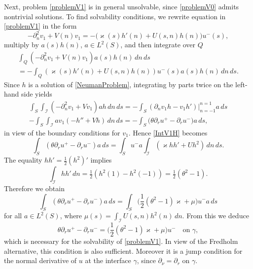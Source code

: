 \documentclass[reqno]{amsart}
\theoremstyle{plain}
\numberwithin{equation}{section}
\renewcommand{\kappa}{\varkappa}
\newcommand{\cI}{\mathcal{I}}
\newcommand{\pte}{\partial_n}
\begin{document}
Next, problem \eqref{problemV1} is in general unsolvable, since \eqref{problemV0} admits  nontrivial solutions.  To find solvabi\-li\-ty conditions, we rewrite  equation in \eqref{problemV1} in the form
\begin{equation}\label{eqnV1Expand}
  -\pte^2 v_1+V(n)v_1=-\big(\kappa(s)h'(n)+U(s,n)h(n)\big)u^-(s),
\end{equation}
multiply  by $a(s)h(n)$, $a\in L^2(S)$,  and then integrate over $Q$
\begin{multline}\label{IntV1H}
\int_{Q}\left(-\pte^2 v_1+V(n)v_1\right)a(s)h(n)\,dn\,ds
\\
=
-\int_{Q}(\kappa(s)h'(n)+U(s,n)h(n))u^-(s)a(s)h(n)\, dn\,ds.
\end{multline}
Since $h$ is a solution of \eqref{NeumanProblem}, integrating by parts twice on the left-hand side yields
\begin{multline*}
\int_{S} \int_{\cI}\left(-\pte^2 v_1+Vv_1\right)a h\,dn \,ds
=-\int_{S}( \partial_n v_1 h-v_1 h')\big|_{n=-1}^{n=1}a\,ds\\-
\int_{S} \int_{\cI} a v_1\left(-h''+Vh\right)\,dn\,ds
=-\int_{S}\big(\theta\partial_r u^+-\partial_r u^-\big) a\,ds,
\end{multline*}
in view of the boundary conditions for $v_1$.
Hence \eqref{IntV1H} becomes
\begin{equation*}
\int_{S}\left(\theta\partial_r u^+-\partial_r u^-\right)a\,ds
=\int_{S} u^-a\int_{\cI}\left(\kappa hh'+U h^2\right)\,dn\,ds.
\end{equation*}
The equality  $hh'=\frac12 (h^2)'$ implies
\begin{equation}\label{IntHHpr}
\int_{\cI}hh'\,dn=\tfrac12 (h^2(1)-h^2(-1))=\tfrac{1}{2 }(\theta^2-1).
\end{equation}
 Therefore we obtain
\begin{equation*}
\int_{S}\left(\theta\partial_r u^+-\partial_r u^-\right)a\,ds
=\int_{S}\big(\textstyle\frac{1}{2}(\theta^2-1)\kappa+\mu \big)u^-a\,ds
\end{equation*}
for all  $a\in L^2(S)$, where $\mu(s)=\int_{\cI} U(s,n)h^2(n)\, dn$.
From this we deduce
\begin{equation*}
  \theta\partial_r u^+-\partial_r u^-
=\big(\textstyle\frac{1}{2}(\theta^2-1)\kappa+\mu \big) u^-\quad\text {on }\gamma,
\end{equation*}
which is necessary for the solvability of \eqref{problemV1}.
In view of the Fredholm alternative, this condition is also  sufficient. Moreover it is a jump condition for the normal derivative of $u$   at the interface $\gamma$, since $\partial_\nu=\partial_r$ on $\gamma$.
\end{document}
